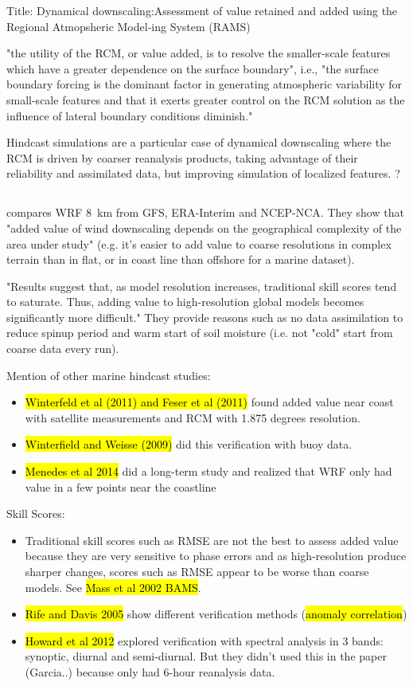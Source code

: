 \documentclass[12pt,a4paper]{article}
\begin{document}
Title: Dynamical downscaling:Assessment of value retained and added using the Regional Atmopsheric Model-ing System (RAMS)

"the utility of the RCM, or value added, is to resolve the smaller-scale features which have a greater dependence on the surface boundary", i.e., "the surface boundary forcing is the dominant factor in generating atmospheric variability for small-scale features and that it exerts greater control on the RCM solution as the influence of lateral boundary conditions diminish."

Hindcast simulations are a particular case of dynamical downscaling where the RCM is driven by coarser reanalysis products, taking advantage of their reliability and assimilated data, but improving simulation of localized features. \cite{Castro2005}?


\subsection{\cite{Garcia-Diez2015}}
\cite{Garcia-Diez2015} compares \gls{WRF} 8~km from \gls{GFS}, ERA-Interim and NCEP-NCA. They show that "added value of wind downscaling depends on the geographical complexity of the area under study" (e.g. it's easier to add value to coarse resolutions in complex terrain than in flat, or in coast line than offshore for a marine dataset). 

"Results suggest that, as model resolution increases, traditional skill scores tend to saturate. Thus, adding value to high-resolution global models becomes significantly more difficult." They provide reasons such as no data assimilation to reduce spinup period and warm start of soil moisture (i.e. not "cold" start from coarse data every run).

Mention of other marine hindcast studies:
\begin{itemize}
\item \hl{Winterfeld et al (2011) and Feser et al (2011)} found added value near coast with satellite measurements and RCM with 1.875 degrees resolution. 
\item \hl{Winterfield and Weisse (2009)} did this verification with buoy data.
\item \hl{Menedes et al 2014} did a long-term study and realized that WRF only had value in a few points near the coastline
\end{itemize}

Skill Scores:
\begin{itemize}
\item Traditional skill scores such as RMSE are not the best to assess added value because they are very sensitive to phase errors and as high-resolution produce sharper changes, scores such as RMSE appear to be worse than coarse models. See \hl{Mass et al 2002 BAMS}. 
\item \hl{Rife and Davis 2005} show different verification methods (\hl{anomaly correlation})
\item \hl{Howard et al 2012} explored verification with spectral analysis in 3 bands: synoptic, diurnal and semi-diurnal. But they didn't used this in the paper (Garcia..) because only had 6-hour reanalysis data.
\end{itemize}
\end{document}
